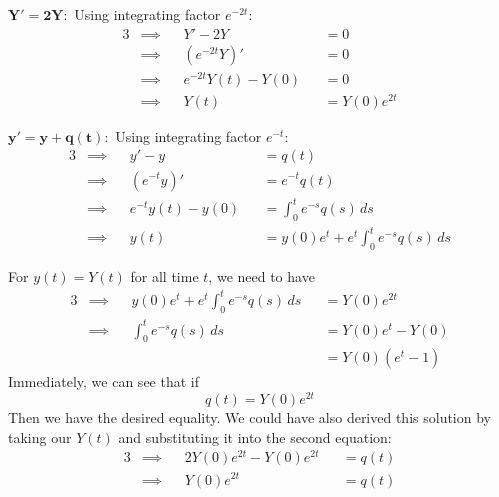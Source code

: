 \documentclass[a4paper]{article}
\begin{document}
\(\bm{Y' = 2Y:}\) Using integrating factor \(e^{-2t}\):
\begin{alignat*}{3}
	&\implies && Y' - 2Y && = 0 \\
	&\implies && \!\left( e^{-2t}Y \right)' && = 0 \\
	&\implies && e^{-2t} Y \!\left( t \right) - Y \!\left( 0 \right) && = 0 \\
	&\implies && Y \!\left( t \right) && = Y \!\left( 0 \right) e^{2t}
\end{alignat*}

\(\bm{y' = y + q \!\left( t \right) :}\) Using integrating factor \(e^{-t}\):
\begin{alignat*}{3}
	&\implies && y' - y && = q \!\left( t \right)  \\
	&\implies && \!\left( e^{-t}y \right)' && = e^{-t}q \!\left( t \right)  \\ 
	&\implies && e^{-t} y \!\left( t \right) - y \!\left( 0 \right) && = \int^{t}_{0} e^{-s}q \!\left( s \right)  \, ds \\
	&\implies && y \!\left( t \right) && = y \!\left( 0 \right) e^{t} + e^{t} \int^{t}_{0} e^{-s}q \!\left( s \right)  \, ds 
\end{alignat*}

For \(y \!\left( t \right) = Y \!\left( t \right) \) for all time \(t\), we need to have
\begin{alignat*}{3}
	&\implies && y \!\left( 0 \right) e^{t} + e^{t} \int^{t}_{0} e^{-s} q \!\left( s \right)  \, ds && = Y \!\left( 0 \right) e^{2t}  \\
	&\implies && \int^{t}_{0} e^{-s} q \!\left( s \right)  \, ds   && = Y \!\left( 0 \right) e^{t} - Y \!\left( 0 \right) \\
	& && && = Y \!\left( 0 \right) \!\left( e^{t} - 1 \right) 
\end{alignat*}
Immediately, we can see that if
\[
	q \!\left( t \right) = Y \!\left( 0 \right) e^{2t}
\]
Then we have the desired equality. We could have also derived this solution by taking our \(Y \!\left( t \right) \) and substituting it into the second equation:
\begin{alignat*}{3}
	&\implies && 2Y \!\left( 0 \right) e^{2t} - Y \!\left( 0 \right) e^{2t} && = q \!\left( t \right)  \\
	&\implies && Y \!\left( 0 \right) e^{2t} && = q \!\left( t \right)  \\ 
\end{alignat*}

\end{document}
